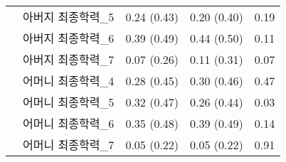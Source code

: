\documentclass{article}
\begin{document}
\begin{table}[t]
{\begin{tabular}{cc|cc|c}
                                                                                                   & 아버지 최종학력\_5  & 0.24 (0.43)          & 0.20 (0.40)           & 0.19                                       \\
                                                                                                   & 아버지 최종학력\_6  & 0.39 (0.49)          & 0.44 (0.50)           & 0.11                                       \\
                                                                                                   & 아버지 최종학력\_7  & 0.07 (0.26)          & 0.11 (0.31)           & 0.07                                       \\
                                                                                                   & 어머니 최종학력\_4  & 0.28 (0.45)              & 0.30 (0.46)               & 0.47                                          \\
                                                                                                   & 어머니 최종학력\_5  & 0.32 (0.47)          & 0.26 (0.44)           & 0.03                                       \\
                                                                                                   & 어머니 최종학력\_6  & 0.35 (0.48)          & 0.39 (0.49)           & 0.14                                       \\
                                                                                                   & 어머니 최종학력\_7  & 0.05 (0.22)          & 0.05 (0.22)           & 0.91                                       \\ \hline
\end{tabular}}
\end{table}
\end{document}
